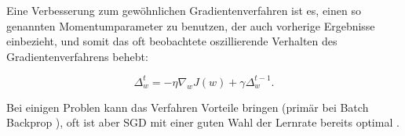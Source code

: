 Eine Verbesserung zum gewöhnlichen Gradientenverfahren ist es, einen so genannten Momentumparameter zu benutzen, der auch vorherige Ergebnisse einbezieht, und somit das oft beobachtete oszillierende Verhalten des Gradientenverfahrens behebt:

\begin{equation}
 \Delta_w^t = - \eta  \nabla_w J(w) + \gamma \Delta_w^{t-1}.
\end{equation}

Bei einigen Problen kann das Verfahren Vorteile bringen (primär bei Batch Backprop \cite{lecunefficient}), oft ist aber SGD mit einer guten Wahl der Lernrate bereits optimal \cite{bengio2012practical}.
